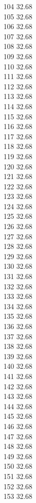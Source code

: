 104	32.68\\
105	32.68\\
106	32.68\\
107	32.68\\
108	32.68\\
109	32.68\\
110	32.68\\
111	32.68\\
112	32.68\\
113	32.68\\
114	32.68\\
115	32.68\\
116	32.68\\
117	32.68\\
118	32.68\\
119	32.68\\
120	32.68\\
121	32.68\\
122	32.68\\
123	32.68\\
124	32.68\\
125	32.68\\
126	32.68\\
127	32.68\\
128	32.68\\
129	32.68\\
130	32.68\\
131	32.68\\
132	32.68\\
133	32.68\\
134	32.68\\
135	32.68\\
136	32.68\\
137	32.68\\
138	32.68\\
139	32.68\\
140	32.68\\
141	32.68\\
142	32.68\\
143	32.68\\
144	32.68\\
145	32.68\\
146	32.68\\
147	32.68\\
148	32.68\\
149	32.68\\
150	32.68\\
151	32.68\\
152	32.68\\
153	32.68\\

